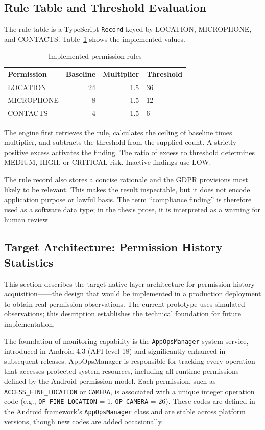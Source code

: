 \subsection{Rule Table and Threshold Evaluation}

The rule table is a TypeScript \texttt{Record} keyed by LOCATION, MICROPHONE, and CONTACTS. Table~\ref{tab:implemented-rules} shows the implemented values.

\begin{table}[H]
\centering
\caption{Implemented permission rules}
\label{tab:implemented-rules}
\begin{tabular}{lrrl}
\toprule
\textbf{Permission} & \textbf{Baseline} & \textbf{Multiplier} & \textbf{Threshold} \\
\midrule
LOCATION & 24 & 1.5 & 36 \\
MICROPHONE & 8 & 1.5 & 12 \\
CONTACTS & 4 & 1.5 & 6 \\
\bottomrule
\end{tabular}
\end{table}

The engine first retrieves the rule, calculates the ceiling of baseline times multiplier, and subtracts the threshold from the supplied count. A strictly positive excess activates the finding. The ratio of excess to threshold determines MEDIUM, HIGH, or CRITICAL risk. Inactive findings use LOW.

The rule record also stores a concise rationale and the GDPR provisions most likely to be relevant. This makes the result inspectable, but it does not encode application purpose or lawful basis. The term ``compliance finding'' is therefore used as a software data type; in the thesis prose, it is interpreted as a warning for human review.

\subsection{Target Architecture: Permission History Statistics}

This section describes the target native-layer architecture for permission history acquisition——the design that would be implemented in a production deployment to obtain real permission observations. The current prototype uses simulated observations; this description establishes the technical foundation for future implementation.

The foundation of monitoring capability is the \texttt{AppOpsManager} system service, introduced in Android 4.3 (API level 18) and significantly enhanced in subsequent releases. AppOpsManager is responsible for tracking every operation that accesses protected system resources, including all runtime permissions defined by the Android permission model. Each permission, such as \texttt{ACCESS\_FINE\_LOCATION} or \texttt{CAMERA}, is associated with a unique integer operation code (e.g., \texttt{OP\_FINE\_LOCATION} = 1, \texttt{OP\_CAMERA} = 26). These codes are defined in the Android framework's \texttt{AppOpsManager} class and are stable across platform versions, though new codes are added occasionally.

